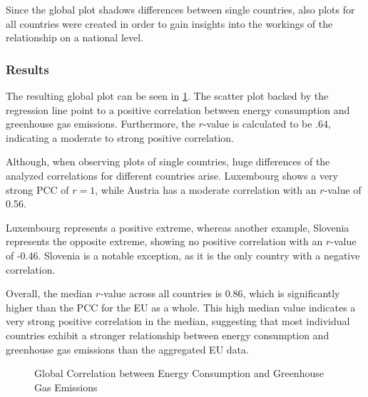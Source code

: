 \documentclass{article}
\begin{document}
Since the global plot shadows differences between single countries, also plots for all countries were created in order to gain
insights into the workings of the relationship on a national level.

\subsubsection*{Results}
The resulting global plot can be seen in \cref{plt:global_consumption_vs_emissions}.
The scatter plot backed by the regression line point to a positive correlation between energy consumption and greenhouse gas emissions.
Furthermore, the $r$-value is calculated to be .64, indicating a moderate to strong positive correlation.

Although, when observing plots of single countries, huge differences of the analyzed correlations for different countries arise.
Luxembourg shows a very strong PCC of $r=1$, while Austria has a moderate correlation with an $r$-value of 0.56.

Luxembourg represents a positive extreme, whereas another example, Slovenia represents the opposite extreme,
showing no positive correlation with an $r$-value of -0.46. Slovenia is a notable exception,
as it is the only country with a negative correlation.

Overall, the median $r$-value across all countries is 0.86, which is significantly higher than the PCC for the EU as a whole.
This high median value indicates a very strong positive correlation in the median, suggesting that most individual countries exhibit a stronger
relationship between energy consumption and greenhouse gas emissions than the aggregated EU data.

\begin{figure}
    \centering
    \resizebox{.7\textwidth}{!}{}
    \caption{Global Correlation between Energy Consumption and Greenhouse Gas Emissions}
    \label{plt:global_consumption_vs_emissions}
\end{figure}

\end{document}
